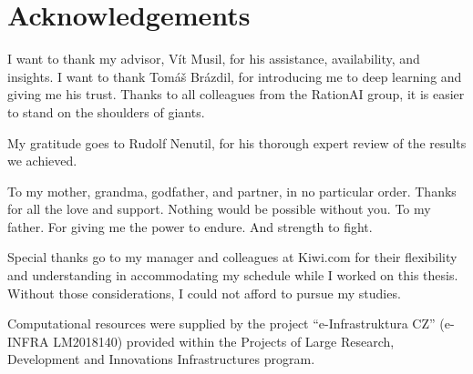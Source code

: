 \chapter*{Acknowledgements}

I want to thank my advisor, Vít Musil, for his assistance, availability, and insights.
I want to thank Tomáš Brázdil, for introducing me to deep learning and giving me his trust.
Thanks to all colleagues from the RationAI group, it is easier to stand on the shoulders of giants.

My gratitude goes to Rudolf Nenutil, for his thorough expert review of the results we achieved.

To my mother, grandma, godfather, and partner, in no particular order.
Thanks for all the love and support.
Nothing would be possible without you.
To my father.
For giving me the power to endure.
And strength to fight.

Special thanks go to my manager and colleagues at Kiwi.com for their flexibility and understanding in accommodating my schedule while I worked on this thesis.
Without those considerations, I could not afford to pursue my studies.

Computational resources were supplied by the project ``e-Infrastruktura CZ'' (e-INFRA LM2018140) provided within the Projects of Large Research, Development and Innovations Infrastructures program.
